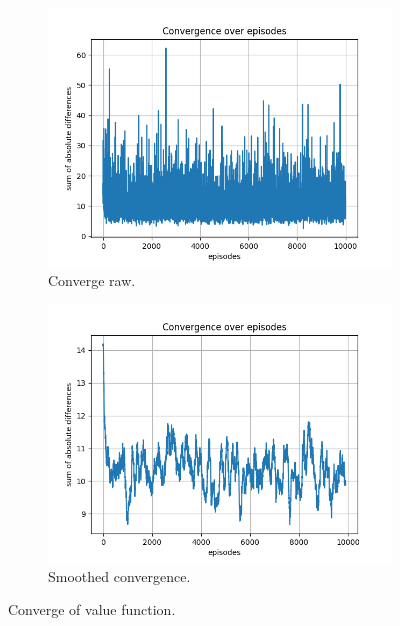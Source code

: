 \documentclass{assignment}
\begin{document}

\begin{figure}[H]
    \begin{subfigure}{0.5\textwidth}
        \includegraphics[width=\textwidth]{figures/convergence_td/default/convergence_TD_alpha_0.1_gamma_0.95_epislon_0.2.png}
    \caption{Converge raw.}
    \end{subfigure}\hfill
    \begin{subfigure}{0.5\textwidth}
        \includegraphics[width=\textwidth]{figures/convergence_td/default/convergence_TD_smoothed_alpha_0.1_gamma_0.95_epislon_0.2.png}
    \caption{Smoothed convergence.}
    \end{subfigure}
    \caption{Converge of value function.}
    \label{fig:default_td_learning_convergence}
\end{figure}
\end{document}
